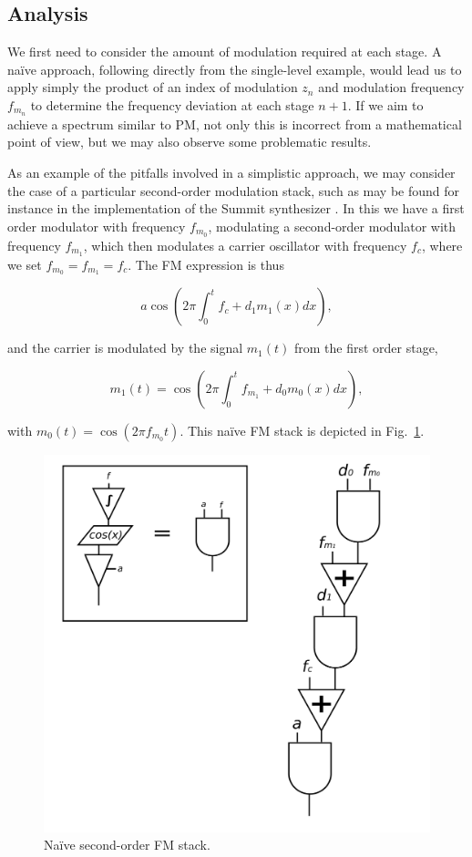 \documentclass[]{interact}
\begin{document}
\subsection{Analysis}

We first need to consider the amount of modulation required at each stage. A na\"{i}ve approach,
following directly from the single-level example, would lead us to apply simply the product of an index of
modulation $z_n$ and modulation frequency $f_{m_n}$ to determine the frequency deviation at each stage $n+1$. 
If we aim to achieve a spectrum similar to PM, not only this is incorrect from a mathematical point of view, but we 
may also observe some problematic results. 

As an example of the pitfalls involved in a simplistic approach, we may consider the case of a particular second-order modulation stack, such as may be found for instance in the implementation of the Summit synthesizer \citep{Summit}. In this we have a first order modulator with frequency $
f_{m_0}$, modulating a second-order modulator with frequency $f_{m_1}$, which then modulates 
a carrier oscillator with frequency $f_{c}$, where we set $f_{m_0} = f_{m_1} = f_c$. The FM expression is thus

\begin{equation} \label{eq:naive1}
a\cos\left(2 \pi \int_0^t f_c + d_1 m_1(x) dx\right),
\end{equation}

\noindent and the carrier is modulated by the signal $m_1(t)$ from the first order stage,

\begin{equation} \label{eq:naive2}
m_1(t) = \cos\left(2\pi \int_0^t f_{m_1} + d_0 m_0(x) dx\right),
\end{equation}

\noindent with $m_0(t) = \cos(2\pi f_{m_0} t)$. This na\"{i}ve FM stack is depicted in
Fig.~\ref{fig:stacked_naive}.

\begin{figure}[htp]
\begin{center}
\includegraphics[width=.5\columnwidth]{naivestack.png}
\caption{Na\"{i}ve second-order FM stack.}
\label{fig:stacked_naive}
\end{center}
\end{figure} 
\end{document}
